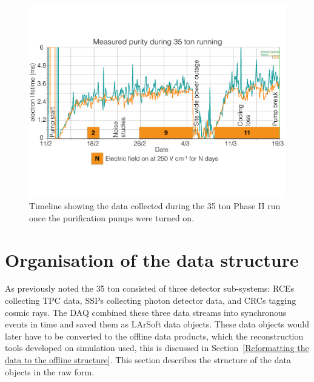 \begin{figure}
  \centering
  \includegraphics[width=1.0\textwidth]{DataCollected}
  \caption[The 35 ton data sample]{Timeline showing the data collected during the 35 ton Phase II run once the purification pumps were turned on.}
  \label{fig:DataCollected}  
\end{figure}

\section{Organisation of the data structure} \label{Organisation of the data structure} %
As previously noted the 35 ton consisted of three detector sub-systems: RCEs collecting TPC data, SSPs collecting photon detector data, and CRCs tagging cosmic rays. The DAQ combined these three data streams into synchronous events in time and saved them as LArSoft data objects. These data objects would later have to be converted to the offline data products, which the reconstruction tools developed on simulation used, this is discussed in Section~\ref{Reformatting the data to the offline structure}. This section describes the structure of the data objects in the raw form.\\

